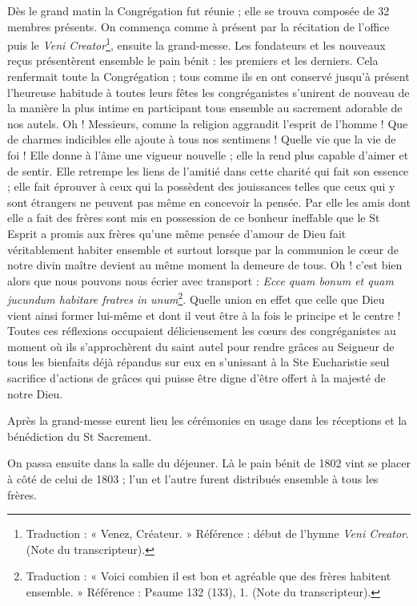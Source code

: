 Dès le grand matin la Congrégation fut réunie ; elle se trouva composée de 32 membres présents. On commença comme à présent par la récitation de l'office puis le \textit{Veni Creator}\footnote{Traduction : « Venez, Créateur. » Référence : début de l’hymne \textit{Veni Creator}. (Note du transcripteur).}, ensuite la grand-messe. Les fondateurs et les nouveaux reçus présentèrent ensemble le pain bénit : les premiers et les derniers. Cela renfermait toute la Congrégation ; tous comme ils en ont conservé jusqu'à présent l'heureuse habitude à toutes leurs fêtes les congréganistes s'unirent de nouveau de la manière la plus intime en participant tous ensemble au sacrement adorable de nos autels. Oh ! Messieurs, comme la religion aggrandit l'esprit de l'homme ! Que de charmes indicibles elle ajoute à tous nos sentimens ! Quelle vie que la vie de foi ! Elle donne à l'âme une vigueur nouvelle ; elle la rend plus capable d'aimer et de sentir. Elle retrempe les liens de l'amitié dans cette charité qui fait son essence ; elle fait éprouver à ceux qui la possèdent des jouissances telles que ceux qui y sont étrangers ne peuvent
pas même en concevoir la pensée. Par elle les amis dont elle a fait des frères sont mis en possession de ce bonheur ineffable que le St Esprit a promis aux frères qu'une même pensée d'amour de Dieu fait véritablement habiter ensemble et surtout lorsque par la communion le cœur de notre divin maître devient au même moment la demeure de tous. Oh ! c'est bien alors que nous pouvons nous écrier avec transport : \textit{Ecce quam bonum et quam jucundum habitare fratres in unum}\footnote{Traduction : « Voici combien il est bon et agréable que des frères habitent ensemble. » Référence : Psaume 132 (133), 1. (Note du transcripteur).}. Quelle union en effet que celle que Dieu vient ainsi former lui-même et dont il veut être à la fois le principe et le centre ! Toutes ces réflexions occupaient délicieusement les cœurs des congréganistes au moment où ils s'approchèrent du saint autel pour rendre grâces au Seigneur de tous les bienfaits déjà répandus sur eux en s'unissant à la Ste Eucharistie seul sacrifice d'actions de grâces qui puisse être digne d'être offert à la majesté de notre Dieu.

Après la grand-messe eurent lieu les cérémonies en usage dans les réceptions et la bénédiction du St Sacrement.

On passa ensuite dans la salle du déjeuner. Là le pain bénit de 1802 vint se placer à côté de celui de 1803 ; l'un et l'autre furent distribués ensemble à tous les frères.

